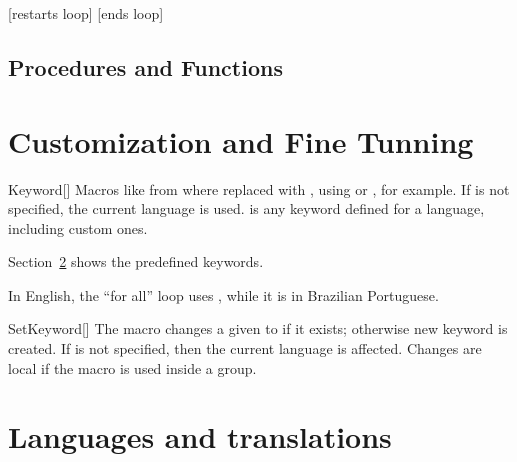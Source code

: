 \documentclass[a4paper, 11pt]{article}
\begin{document}
\begin{tcblisting}{}
    \begin{algorithmic}
        \Loop
                \Statep{\Continue}[restarts loop]
            \EndIf
                \Statep{\Break}[ends loop]
            \EndIf
        \EndLoop
    \end{algorithmic}
\end{tcblisting}

\subsection{Procedures and Functions}


\section{Customization and Fine Tunning}

\begin{macro}{Keyword}[]
    Macros like  from  where replaced with , using  or , for example.
    If  is not specified, the current language is used.  is any keyword defined for a language, including custom ones.

    Section~\ref{sec:languages-and-translations} shows the predefined keywords.

    \begin{tcblisting}{}
        In English, the ``for all'' loop uses , while it is  in Brazilian Portuguese.
    \end{tcblisting}
\end{macro}

\begin{macro}{SetKeyword}[]
    The macro  changes a given  to  if it exists; otherwise new keyword is created.
    If  is not specified, then the current language is affected. Changes are local if the macro is used inside a group.
\end{macro}


\section{Languages and translations}\label{sec:languages-and-translations}






\clearpage
\printindex
\end{document}
